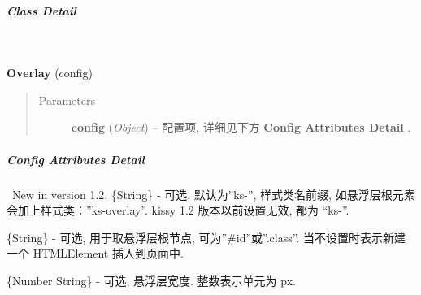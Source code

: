 \documentclass[letterpaper,10pt,english]{sphinxmanual}
\begin{document}
\subparagraph{Class Detail}
\label{api/component/overlay/overlay:class-detail}

\begin{fulllineitems}
\label{api/component/overlay/overlay:Overlay.Overlay}~
\begin{DUlineblock}{0em}
\item[] \textbf{Overlay} (config)
\end{DUlineblock}
\begin{quote}\begin{description}
\item[{Parameters}] \leavevmode
\textbf{config} (\emph{Object}) -- 配置项, 详细见下方 \textbf{Config Attributes Detail} .

\end{description}\end{quote}

\end{fulllineitems}



\subparagraph{Config Attributes Detail}
\label{api/component/overlay/overlay:config-attributes-detail}

\begin{fulllineitems}
\label{api/component/overlay/overlay:Overlay.prefixCls}~New in version 1.2.
\{String\} - 可选, 默认为''ks-'', 样式类名前缀, 如悬浮层根元素会加上样式类：''ks-overlay''. kissy 1.2 版本以前设置无效, 都为 ``ks-''.

\end{fulllineitems}



\begin{fulllineitems}
\label{api/component/overlay/overlay:Overlay.srcNode}
\{String\} - 可选, 用于取悬浮层根节点, 可为''\#id''或''.class''. 当不设置时表示新建一个 HTMLElement 插入到页面中.

\end{fulllineitems}



\begin{fulllineitems}
\label{api/component/overlay/overlay:Overlay.width}
\{Number \textbar{} String\} - 可选, 悬浮层宽度. 整数表示单元为 px.

\end{fulllineitems}
\end{document}
